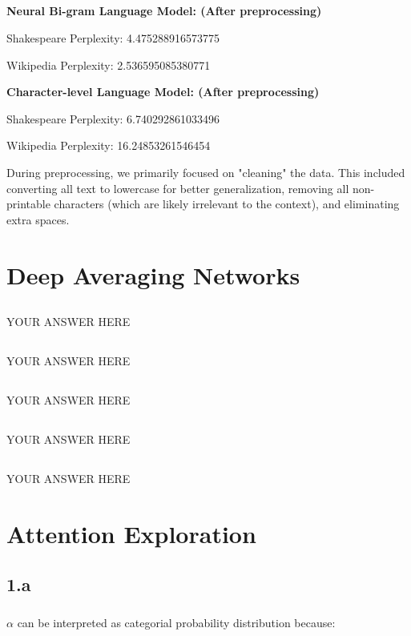 \documentclass{article}
\begin{document}
\subsection{}
\textbf{Neural Bi-gram Language Model: (After preprocessing)}

Shakespeare Perplexity: 4.475288916573775

Wikipedia Perplexity: 2.536595085380771

\textbf{Character-level Language
Model: (After preprocessing)}

Shakespeare Perplexity: 6.740292861033496

Wikipedia Perplexity: 16.24853261546454

During preprocessing, we primarily focused on "cleaning" the data. This included converting all text to lowercase for better generalization, removing all non-printable characters (which are likely irrelevant to the context), and eliminating extra spaces.

\section{Deep Averaging Networks}
\subsection{}
YOUR ANSWER HERE
\subsection{}
YOUR ANSWER HERE
\subsection{}
YOUR ANSWER HERE
\subsection{}
YOUR ANSWER HERE
\subsection{}
YOUR ANSWER HERE

\section{Attention Exploration}
\subsection{1.a}
\subsubsection{}
\(\alpha\) can be interpreted as categorial probability distribution because:
\end{document}
